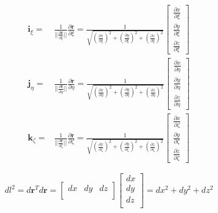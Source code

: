 \documentclass
[
a4paper,                      %
twoside,					  %
12pt,                         %
abstract,		      %
fleqn,                        %
]
{scrartcl} %
\begin{document}
\begin{description}
\begin{equation}
\begin{aligned}
\mathbf{i}_{\xi}=&\frac{1}{\lvert\lvert\frac{\partial \mathbf{r}}{\partial\xi}\rvert\rvert}\frac{\partial \mathbf{r}}{\partial\xi}=\frac{1}{\sqrt{\left(\frac{\partial x}{\partial\xi}\right)^{2}+\left(\frac{\partial y}{\partial\xi}\right)^{2}+\left(\frac{\partial z}{\partial\xi}\right)^{2}}}\begin{bmatrix}
\frac{\partial x}{\partial\xi}\\[5pt]
\frac{\partial y}{\partial\xi}\\[5pt]
\frac{\partial z}{\partial\xi}\end{bmatrix}\\
\mathbf{j}_{\eta}=&\frac{1}{\lvert\lvert\frac{\partial \mathbf{r}}{\partial\eta}\rvert\rvert}\frac{\partial \mathbf{r}}{\partial\eta}=\frac{1}{\sqrt{\left(\frac{\partial x}{\partial\eta}\right)^{2}+\left(\frac{\partial y}{\partial\eta}\right)^{2}+\left(\frac{\partial z}{\partial\eta}\right)^{2}}}\begin{bmatrix}
\frac{\partial x}{\partial\eta}\\[5pt]
\frac{\partial y}{\partial\eta}\\[5pt]
\frac{\partial z}{\partial\eta}\end{bmatrix}\\
\mathbf{k}_{\zeta}=&\frac{1}{\lvert\lvert\frac{\partial \mathbf{r}}{\partial\zeta}\rvert\rvert}\frac{\partial \mathbf{r}}{\partial\zeta}=\frac{1}{\sqrt{\left(\frac{\partial x}{\partial\zeta}\right)^{2}+\left(\frac{\partial y}{\partial\zeta}\right)^{2}+\left(\frac{\partial z}{\partial\zeta}\right)^{2}}}\begin{bmatrix}
\frac{\partial x}{\partial\zeta}\\[5pt]
\frac{\partial y}{\partial\zeta}\\[5pt]
\frac{\partial z}{\partial\zeta}\end{bmatrix}
\end{aligned}
\end{equation}

\begin{equation}
dl^{2}=d\mathbf{r}^{T}d\mathbf{r}=\begin{bmatrix}
dx&
dy&
dz\\
\end{bmatrix}\begin{bmatrix}
dx\\
dy\\
dz\\
\end{bmatrix}=dx^{2}+dy^{2}+dz^{2}
\end{equation}


\end{description}
\end{document}
